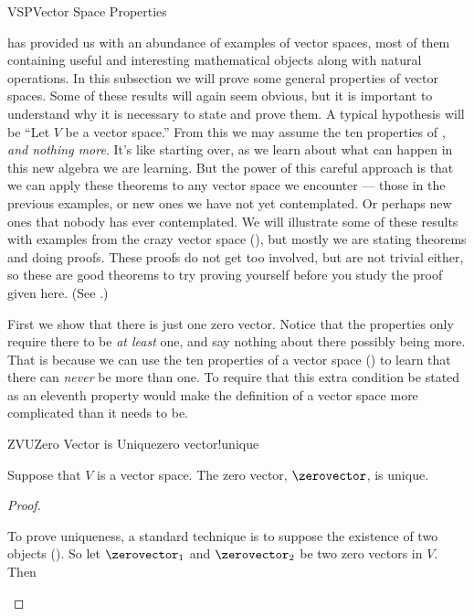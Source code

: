 \begin{subsect}{VSP}{Vector Space Properties}
%
\begin{para} has provided us with an abundance of examples of vector spaces, most of them containing useful and interesting mathematical objects along with natural operations.  In this subsection we will prove some general properties of vector spaces.  Some of these results will again seem obvious, but it is important to understand why it is necessary to state and prove them.  A typical hypothesis will be ``Let $V$ be a vector space.''  From this we may assume the ten properties of , {\em and nothing more}.  It's like starting over, as we learn about what can happen in this new algebra we are learning.  But the power of this careful approach is that we can apply these theorems to any vector space we encounter --- those in the previous examples, or new ones we have not yet contemplated.  Or perhaps new ones that nobody has ever contemplated.  We will illustrate some of these results with examples from the crazy vector space (), but mostly we are stating theorems and doing proofs.  These proofs do not get too involved, but are not trivial either, so these are good theorems to try proving yourself before you study the proof given here.  (See .)\end{para}
%
\begin{para}First we show that there is just one zero vector.  Notice that the properties only require there to be {\em at least} one, and say nothing about there possibly being more.  That is because we can use the ten properties of a vector space () to learn that there can {\em never} be more than one.  To require that this extra condition be stated as an eleventh property would make the definition of a vector space more complicated than it needs to be.\end{para}
%
\begin{theorem}{ZVU}{Zero Vector is Unique}{zero vector!unique}
%
\begin{para}Suppose that $V$ is a vector space.   The zero vector, $\zerovector$,  is unique.\end{para}
%
\end{theorem}
%
\begin{proof}
\begin{para}To prove uniqueness, a standard technique is to suppose the existence of two objects ().  So let $\zerovector_1$ and $\zerovector_2$ be two zero vectors in $V$.  Then

\end{para}
\end{proof}
\end{subsect}
